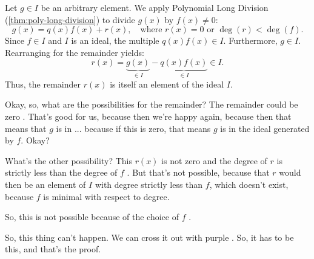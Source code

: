 \begin{proofWrapper}
\begin{content}
Let $g \in I$ be an arbitrary element. We apply Polynomial Long Division (\cref{thm:poly-long-division}) to divide $g(x)$ by $f(x) \neq 0$:
\begin{equation}\label{eq:div-g-by-f}
g(x) = q(x) f(x) + r(x), \quad \text{where } r(x) = 0 \text{ or } \deg(r) < \deg(f).
\end{equation}
Since $f \in I$ and $I$ is an ideal, the multiple $q(x) f(x) \in I$. Furthermore, $g \in I$.
Rearranging for the remainder yields:
\begin{equation}\label{eq:remainder-in-ideal}
r(x) = \underbrace{g(x)}_{\in I} - \underbrace{q(x) f(x)}_{\in I} \in I.
\end{equation}
Thus, the remainder $r(x)$ is itself an element of the ideal $I$.
\end{content}

\begin{speech}[00:35:16 - 00:36:26]
Okay, so, what are the possibilities for the remainder? The remainder could be zero . That's good for us, because then we're happy again, because then that means that $g$ is in ... because if this is zero, that means $g$ is in the ideal generated by $f$. Okay?

What's the other possibility? This $r(x)$ is not zero  and the degree of $r$ is strictly less than the degree of $f$ . But that's not possible, because that $r$ would then be an element of $I$ with degree strictly less than $f$, which doesn't exist, because $f$ is minimal with respect to degree.

So, this is not possible  because of the choice of $f$ .

So, this thing can't happen. We can cross it out with purple . So, it has to be this, and that's the proof.
\end{speech}


\end{proofWrapper}
